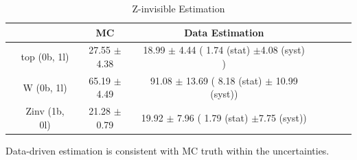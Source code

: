 \begin{table}[!htb]
\small
\setlength{\tabcolsep}{20pt} 
\begin{center} 
\begin{tabular}{lccccccc} 
\hline\hline
&                 &    MC                     & Data Estimation\\\hline \hline
& top  (0b, 1l)     & 27.55 $\pm$ 4.38             &18.99 $\pm$ 4.44 ( 1.74 (stat) $\pm$4.08 (syst) )\\
&  W   (0b, 1l)     & 65.19 $\pm$ 4.49            & 91.08 $\pm$ 13.69 ( 8.18 (stat) $\pm$ 10.99 (syst))\\ 
& Zinv (1b, 0l)           &  21.28 $\pm$ 0.79            &19.92 $\pm$ 7.96 ( 1.79 (stat) $\pm$7.75 (syst))\\




\hline\hline 
\end{tabular} 
\caption{Z-invisible Estimation}
\label{tab:ZinvFinalRes}
\end{center} 
\end{table}

Data-driven estimation is consistent with MC truth within the uncertainties.